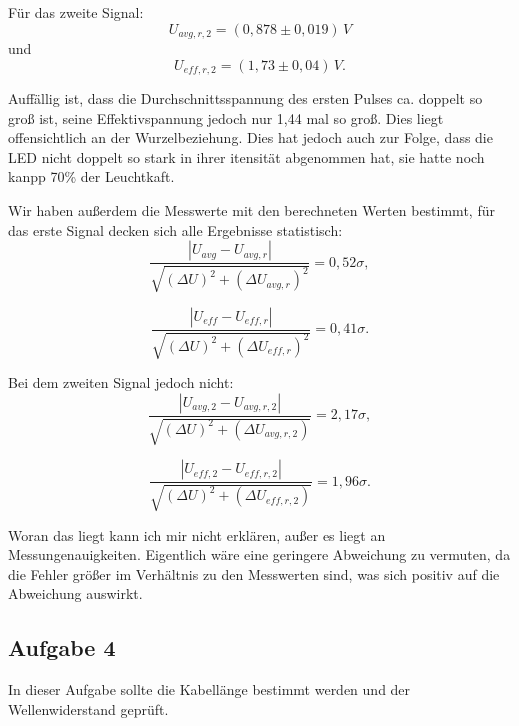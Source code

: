 Für das zweite Signal:
\begin{equation}
    \boxed{
        U_{avg,r,2} = (0,878 \pm 0,019) \, V
    }
\end{equation}
und 
\begin{equation}
    \boxed{
        U_{eff,r,2} = (1,73 \pm 0,04) \, V
    }.
\end{equation}


Auffällig ist, dass die Durchschnittsspannung des ersten Pulses ca. doppelt so groß ist, seine Effektivspannung jedoch nur 1,44 mal so groß. Dies liegt offensichtlich an der Wurzelbeziehung. Dies hat jedoch auch zur Folge, dass die LED nicht doppelt so stark in ihrer itensität abgenommen hat, sie hatte noch kanpp 70\% der Leuchtkaft.

Wir haben außerdem die Messwerte mit den berechneten Werten bestimmt, für das erste Signal decken sich alle Ergebnisse statistisch:
\begin{equation}
    \frac{\left| U_{avg} - U_{avg,r} \right|}{\sqrt{(\Delta U)^2 + (\Delta U_{avg,r})^2}} = 0,52\sigma,
\end{equation}

\begin{equation}
    \frac{\left| U_{eff} - U_{eff,r} \right|}{\sqrt{(\Delta U)^2 + (\Delta U_{eff,r})^2}} = 0,41\sigma.
\end{equation}

Bei dem zweiten Signal jedoch nicht:
\begin{equation}
    \frac{\left| U_{avg,2} - U_{avg,r,2}\right|}{\sqrt{(\Delta U)^2 + (\Delta  U_{avg,r,2})}} = 2,17\sigma,
\end{equation} 

\begin{equation}
    \frac{\left| U_{eff,2} - U_{eff,r,2}\right|}{\sqrt{(\Delta U)^2 + (\Delta  U_{eff,r,2})}} = 1,96\sigma.
\end{equation} 

Woran das liegt kann ich mir nicht erklären, außer es liegt an Messungenauigkeiten. Eigentlich wäre eine geringere Abweichung zu vermuten, da die Fehler größer im Verhältnis zu den Messwerten sind, was sich positiv auf die Abweichung auswirkt. 

\subsection*{Aufgabe 4}
In dieser Aufgabe sollte die Kabellänge bestimmt werden und der Wellenwiderstand geprüft.

